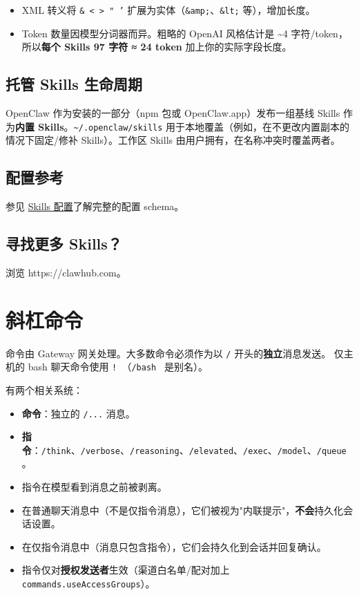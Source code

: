 \begin{itemize}
  \item XML 转义将 \texttt{\& < > " '} 扩展为实体（\texttt{\&amp;}、\texttt{\&lt;} 等），增加长度。
  \item Token 数量因模型分词器而异。粗略的 OpenAI 风格估计是 \textasciitilde{}4 字符/token，所以\textbf{每个 Skills 97 字符 ≈ 24 token} 加上你的实际字段长度。
\end{itemize}


\subsection{托管 Skills 生命周期}


OpenClaw 作为安装的一部分（npm 包或 OpenClaw.app）发布一组基线 Skills 作为\textbf{内置 Skills}。\texttt{\textasciitilde{}/.openclaw/skills} 用于本地覆盖（例如，在不更改内置副本的情况下固定/修补 Skills）。工作区 Skills 由用户拥有，在名称冲突时覆盖两者。

\subsection{配置参考}


参见 \href{/tools/skills-config}{Skills 配置}了解完整的配置 schema。

\subsection{寻找更多 Skills？}


浏览 https://clawhub.com。

\hrulefill



\clearpage

\section{斜杠命令}


命令由 Gateway 网关处理。大多数命令必须作为以 \texttt{/} 开头的\textbf{独立}消息发送。
仅主机的 bash 聊天命令使用 \texttt{! }（\texttt{/bash } 是别名）。

有两个相关系统：

\begin{itemize}
  \item \textbf{命令}：独立的 \texttt{/...} 消息。
  \item \textbf{指令}：\texttt{/think}、\texttt{/verbose}、\texttt{/reasoning}、\texttt{/elevated}、\texttt{/exec}、\texttt{/model}、\texttt{/queue}。
  \item 指令在模型看到消息之前被剥离。
  \item 在普通聊天消息中（不是仅指令消息），它们被视为"内联提示"，\textbf{不会}持久化会话设置。
  \item 在仅指令消息中（消息只包含指令），它们会持久化到会话并回复确认。
  \item 指令仅对\textbf{授权发送者}生效（渠道白名单/配对加上 \texttt{commands.useAccessGroups}）。
\end{itemize}

